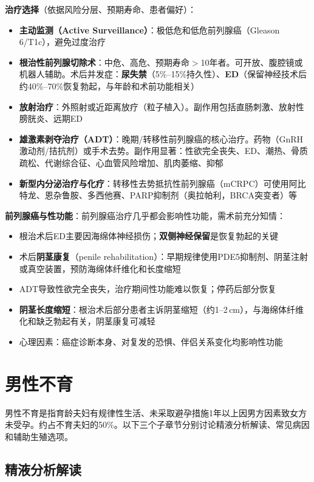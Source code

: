 \textbf{治疗选择}（依据风险分层、预期寿命、患者偏好）：
\begin{itemize}[leftmargin=2cm]
	\item \textbf{主动监测（Active Surveillance）}：极低危和低危前列腺癌（Gleason 6/T1c），避免过度治疗
	\item \textbf{根治性前列腺切除术}：中危、高危、预期寿命$>$10年者。可开放、腹腔镜或机器人辅助。术后并发症：\textbf{尿失禁}（5\%--15\%持久性）、\textbf{ED}（保留神经技术后约40\%--70\%恢复勃起，与年龄和术前功能相关）
	\item \textbf{放射治疗}：外照射或近距离放疗（粒子植入）。副作用包括直肠刺激、放射性膀胱炎、远期ED
	\item \textbf{雄激素剥夺治疗（ADT）}：晚期/转移性前列腺癌的核心治疗。药物（GnRH激动剂/拮抗剂）或手术去势。副作用显著：性欲完全丧失、ED、潮热、骨质疏松、代谢综合征、心血管风险增加、肌肉萎缩、抑郁
	\item \textbf{新型内分泌治疗与化疗}：转移性去势抵抗性前列腺癌（mCRPC）可使用阿比特龙、恩杂鲁胺、多西他赛、PARP抑制剂（奥拉帕利，BRCA突变者）等
\end{itemize}

\textbf{前列腺癌与性功能}：前列腺癌治疗几乎都会影响性功能，需术前充分知情：
\begin{itemize}[leftmargin=2cm]
	\item 根治术后ED主要因海绵体神经损伤；\textbf{双侧神经保留}是恢复勃起的关键
	\item 术后\textbf{阴茎康复}（penile rehabilitation）：早期规律使用PDE5抑制剂、阴茎注射或真空装置，预防海绵体纤维化和长度缩短
	\item ADT导致性欲完全丧失，治疗期间性功能难以恢复；停药后部分恢复
	\item \textbf{阴茎长度缩短}：根治术后部分患者主诉阴茎缩短（约1--2\,cm），与海绵体纤维化和缺乏勃起有关，阴茎康复可减轻
	\item 心理因素：癌症诊断本身、对复发的恐惧、伴侣关系变化均影响性功能
\end{itemize}

\section{男性不育}

男性不育是指育龄夫妇有规律性生活、未采取避孕措施1年以上因男方因素致女方未受孕。约占不育夫妇的50\%。以下三个子章节分别讨论精液分析解读、常见病因和辅助生殖选项。

\subsection{精液分析解读}

